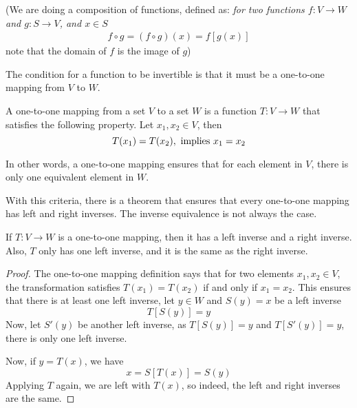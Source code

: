 \documentclass[../linear-spaces.tex]{subfiles}
\begin{document}
(We are doing a composition of functions, defined as: \textit{for two
    functions $f: V\to W$ and $g: S \to V$, and $x\in S$}
\begin{equation}
    \begin{split}
        f\circ g = (f\circ g)(x) = f\left[g(x)\right]
    \end{split}
\end{equation}
note that the domain of $f$ is the image of $g$)

The condition for a function to be invertible is that it must be a one-to-one
mapping from $V$ to $W$.

\begin{definition}
    A one-to-one mapping from a set $V$ to a set $W$ is a function $T: V \to W$ that satisfies the following property.
    Let $x_1,x_2\in V$, then
    \begin{equation}
        T(x_1) = T(x_2), \textnormal{ implies } x_1 = x_2
    \end{equation}

    In other words, a one-to-one mapping ensures that for each element in $V$,
    there is only one equivalent element in $W$.
\end{definition}

With this criteria, there is a theorem that ensures that every one-to-one
mapping has left and right inverses. The inverse equivalence is not always the
case.

\begin{theorem}
    If $T:V \to W$ is a one-to-one mapping, then it has a left inverse and a right inverse. Also, $T$ only has one left inverse,
    and it is the same as the right inverse.
\end{theorem}

\begin{proof}
    The one-to-one mapping definition says that for two elements $x_1,x_2\in V$, the transformation
    satisfies $T(x_1) = T(x_2)$ if and only if $x_1=x_2$. This ensures that there is at least one left
    inverse, let $y\in W$ and $S(y)=x$ be a left inverse
    \begin{equation*}
        T\left[S(y)\right] = y
    \end{equation*}
    Now, let $S'(y)$ be another left inverse, as $T\left[S(y)\right] = y$ and $T\left[S'(y)\right] = y$,
    there is only one left inverse.

    Now, if $y=T(x)$, we have
    \begin{equation}
        x = S\left[T(x)\right] = S(y)
    \end{equation}
    Applying $T$ again, we are left with $T(x)$, so indeed, the left and right inverses are the same.
\end{proof}
\end{document}
